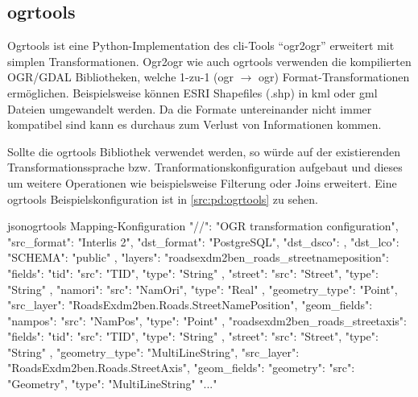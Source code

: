 
\subsection{ogrtools}

Ogrtools ist eine Python-Implementation des \acs{cli}-Tools ``ogr2ogr'' erweitert mit simplen Transformationen. Ogr2ogr wie auch ogrtools verwenden die kompilierten OGR/GDAL Bibliotheken, welche 1-zu-1 (ogr $\to$ ogr) Format-Transformationen ermöglichen. Beispielsweise können ESRI Shapefiles (.shp) in \gls{kml} oder \gls{gml} Dateien umgewandelt werden. Da die Formate untereinander nicht immer kompatibel sind kann es durchaus zum Verlust von Informationen kommen.

Sollte die ogrtools Bibliothek verwendet werden, so würde auf der existierenden Transformationssprache bzw. Tranformationskonfiguration aufgebaut und dieses um weitere Operationen wie beispielsweise Filterung oder Joins erweitert. Eine ogrtools Beispielskonfiguration \cite[README, ogrtransform library]{ogrtools} ist in \cref{src:pd:ogrtools} zu sehen.


\begin{srclst}[label=src:pd:ogrtools]{json}{ogrtools Mapping-Konfiguration}
{
  "//": "OGR transformation configuration",
  "src_format": "Interlis 2",
  "dst_format": "PostgreSQL",
  "dst_dsco": {},
  "dst_lco": {
    "SCHEMA": "public"
  },
  "layers": {
    "roadsexdm2ben_roads_streetnameposition": {
      "fields": {
        "tid": {
          "src": "TID",
          "type": "String"
        },
        "street": {
          "src": "Street",
          "type": "String"
        },
        "namori": {
          "src": "NamOri",
          "type": "Real"
        }
      },
      "geometry_type": "Point",
      "src_layer": "RoadsExdm2ben.Roads.StreetNamePosition",
      "geom_fields": {
        "nampos": {
          "src": "NamPos",
          "type": "Point"
        }
      }
    },
    "roadsexdm2ben_roads_streetaxis": {
      "fields": {
        "tid": {
          "src": "TID",
          "type": "String"
        },
        "street": {
          "src": "Street",
          "type": "String"
        }
      },
      "geometry_type": "MultiLineString",
      "src_layer": "RoadsExdm2ben.Roads.StreetAxis",
      "geom_fields": {
        "geometry": {
          "src": "Geometry",
          "type": "MultiLineString"
        }
      }
    }
  }
  "..."
}
\end{srclst}

